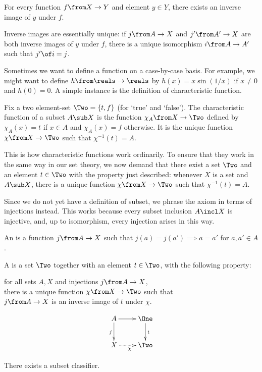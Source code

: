 \documentclass[12pt]{article}
\begin{document}
\begin{axiom}{7}
For every function $f\from X \to Y$ and element $y \in Y$, there exists an
inverse image of $y$ under $f$.
\end{axiom}

Inverse images are essentially unique: if $j\from A \to X$ and
$j'\from A' \to X$ are both inverse images of $y$ under $f$, there is a
unique isomorphism $i \from A \to A'$ such that $j' \of i = j$. 


% 
Sometimes we want to define a function on a case-by-case basis.  For
example, we might want to define $h\from \reals \to \reals$ by $h(x) = x
\sin(1/x)$ if $x \neq 0$ and $h(0) = 0$.  A simple instance is the
definition of characteristic function.

Fix a two element-set $\Two = \{t, f\}$ (for `true' and `false').  The
characteristic function of a subset $A \sub X$ is the function $\chi_A
\from X \to \Two$ defined by $\chi_A(x) = t$ if $x \in A$ and $\chi_A(x)
= f$ otherwise.  It is the unique function $\chi\from X \to \Two$ such
that $\chi^{-1}(t) = A$.  

This is how characteristic functions work ordinarily.  To ensure that they
work in the same way in our set theory, we now demand that there exist a
set $\Two$ and an element $t \in \Two$ with the property just described:
whenever $X$ is a set and $A \sub X$, there is a unique function $\chi\from
X \to \Two$ such that $\chi^{-1}(t) = A$.

Since we do not yet have a definition of subset, we phrase the axiom in
terms of injections instead.  This works because every subset inclusion $A
\incl X$ is injective, and, up to isomorphism, every injection arises in
this way.

\begin{dfn}
An  is a function $j \from A \to X$ such that $j(a) =
j(a') \implies a = a'$ for $a, a' \in A$.

A  is a set $\Two$ together with an element $t \in
\Two$, with the following property:
% 
\begin{defnprop}
for all sets $A, X$ and injections $j\from A \to X$,\\ 
there is a unique function $\chi\from X \to \Two$ such that\\ 
$j\from A \to X$ is an inverse image of $t$ under $\chi$.
\end{defnprop}
\end{dfn}
\[
\xymatrix{
A \ar[r] \ar[d]_j       &\One \ar[d]^t  \\
X \ar@{.>}[r]_\chi      &\Two
}
\]
% 
\begin{axiom}{8}
There exists a subset classifier.
\end{axiom}
\end{document}
